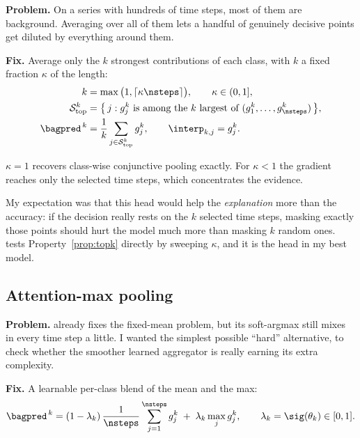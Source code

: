 \textbf{Problem.} On a series with hundreds of time steps, most of them are background. Averaging
over all of them lets a handful of genuinely decisive points get diluted by everything around them.

\textbf{Fix.} Average only the $k$ strongest contributions of each class, with $k$ a fixed fraction
$\kappa$ of the length:
\begin{align}
  k &= \max\big(1, \lceil \kappa \nsteps \rceil\big), \qquad \kappa \in (0,1],
  \label{eq:topk_k}\\
  \mathcal{S}^k_{\text{top}} &= \big\{\, j : g_j^k \text{ is among the } k
    \text{ largest of } (g_1^k,\dots,g_{\nsteps}^k) \,\big\},
  \label{eq:topk_set}\\
  \bagpred^{\,k} &= \frac{1}{k}\sum_{j \in \mathcal{S}^k_{\text{top}}} g_j^k,
  \qquad
  \interp_{k,j} = g_j^k .
  \label{eq:topk_bag}
\end{align}

\begin{property}
\label{prop:topk}
$\kappa = 1$ recovers class-wise conjunctive pooling exactly. For $\kappa < 1$ the gradient reaches
only the selected time steps, which concentrates the evidence.
\end{property}

My expectation was that this head would help the \emph{explanation} more than the accuracy: if the
decision really rests on the $k$ selected time steps, masking exactly those points should hurt the
model much more than masking $k$ random ones.  tests
Property~\ref{prop:topk} directly by sweeping $\kappa$, and it is the head in my best model.

\subsection{Attention-max pooling}
\label{sec:pool:attnmax}

\textbf{Problem.}  already fixes the fixed-mean problem, but its soft-argmax
still mixes in every time step a little. I wanted the simplest possible ``hard'' alternative, to
check whether the smoother learned aggregator is really earning its extra complexity.

\textbf{Fix.} A learnable per-class blend of the mean and the max:
\begin{equation}
  \bagpred^{\,k} = (1-\lambda_k)\,\frac{1}{\nsteps}\sum_{j=1}^{\nsteps} g_j^k
                   \; + \; \lambda_k \max_{j} g_j^k ,
  \qquad \lambda_k = \sig(\theta_k) \in [0,1].
  \label{eq:attnmax}
\end{equation}

